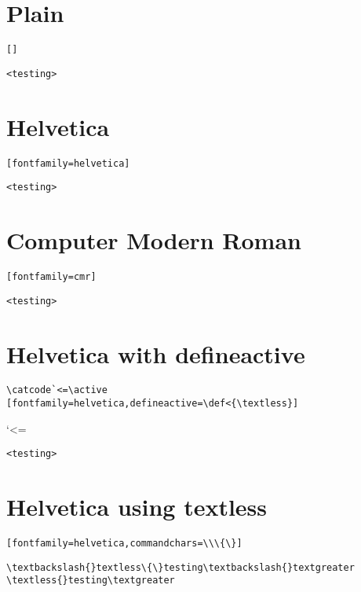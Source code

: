 \documentclass{article}
\begin{document}
\begin{abstract}
I am getting strange results when using fancyvrb. When I change from
the default ({\texttt{tt}}) font \textless{} and \textgreater{} are
getting changed to < and > like they do in a normal document. This is
simple some verbatim blocks with different options.

I sent mail to the author and they recommended using the TI font
encoding like so: \verb+\usepackage[T1]{fontenc}+. By default though
it makes cmr ugly (non-antialiased) in pdfs.
\end{abstract}

\section{Plain}

\verb+[]+

\begin{Verbatim}
<testing>
\end{Verbatim}

\section{Helvetica}

\verb+[fontfamily=helvetica]+

\begin{Verbatim}[fontfamily=helvetica]
<testing>
\end{Verbatim}

\section{Computer Modern Roman}

\verb+[fontfamily=cmr]+

\begin{Verbatim}[fontfamily=cmr]
<testing>
\end{Verbatim}

\section{Helvetica with defineactive}

\verb+\catcode`<=\active [fontfamily=helvetica,defineactive=\def<{\textless}]+

\catcode`<=\active
\begin{Verbatim}[fontfamily=helvetica,defineactive=\def<{\textless}]
<testing>
\end{Verbatim}

\section{Helvetica using textless}

\verb+[fontfamily=helvetica,commandchars=\\\{\}]+

\begin{Verbatim}[fontfamily=helvetica,commandchars=\\\{\}]
\textbackslash{}textless\{\}testing\textbackslash{}textgreater
\textless{}testing\textgreater
\end{Verbatim}
\end{document}
